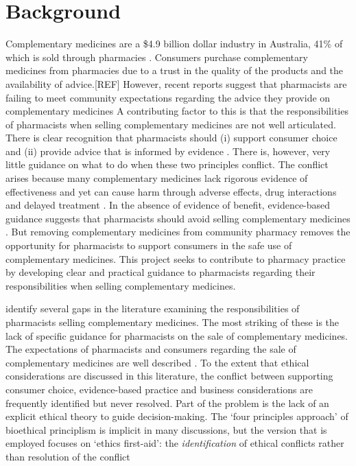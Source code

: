\documentclass[11pt,a4paper]{article}
\begin{document}
\section{Background}\label{background}

Complementary medicines are a \$4.9 billion dollar industry in
Australia, 41\% of which is sold through pharmacies
\autocite{ComplementaryMedicinesAustralia2018}. Consumers purchase
complementary medicines from pharmacies due to a trust in the quality of
the products and the availability of advice.{[}REF{]} However, recent
reports suggest that pharmacists are failing to meet community
expectations regarding the advice they provide on complementary
medicines \autocites{Bray2017}{Thompson2017}{Arnold2016}[.][]{King2017}
A contributing factor to this is that the responsibilities of
pharmacists when selling complementary medicines are not well
articulated. There is clear recognition that pharmacists should (i)
support consumer choice and (ii) provide advice that is informed by
evidence \autocites{InternationalPharmaceuticalFederation2014}{PSA2017}.
There is, however, very little guidance on what to do when these two
principles conflict. The conflict arises because many complementary
medicines lack rigorous evidence of effectiveness and yet can cause harm
through adverse effects, drug interactions and delayed treatment
\autocites{Myers2004}{Izzo2009}. In the absence of evidence of benefit,
evidence-based guidance suggests that pharmacists should avoid selling
complementary medicines \autocite{Ernst1996}. But removing complementary
medicines from community pharmacy removes the opportunity for
pharmacists to support consumers in the safe use of complementary
medicines. This project seeks to contribute to pharmacy practice by
developing clear and practical guidance to pharmacists regarding their
responsibilities when selling complementary medicines.

\textcite{SalmanPopattia2018} identify several gaps in the literature
examining the responsibilities of pharmacists selling complementary
medicines. The most striking of these is the lack of specific guidance
for pharmacists on the sale of complementary medicines. The expectations
of pharmacists and consumers regarding the sale of complementary
medicines are well described
\autocites{Iyer2016a}{Tran:2013kh}{Kanjanarach2011}. To the extent that
ethical considerations are discussed in this literature, the conflict
between supporting consumer choice, evidence-based practice and business
considerations are frequently identified but never resolved. Part of the
problem is the lack of an explicit ethical theory to guide
decision-making. The `four principles approach' of bioethical
principlism is implicit in many discussions, but the version that is
employed focuses on `ethics first-aid': the \emph{identification} of
ethical conflicts rather than resolution of the conflict
\autocites{Beauchamp2012}{Pullman2005}
\end{document}
